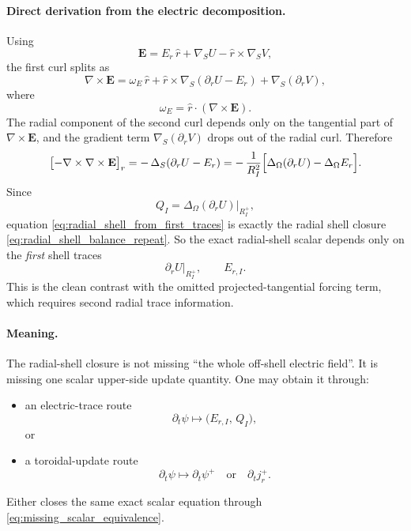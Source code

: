 \documentclass[11pt,a4paper]{article}
\begin{document}
\paragraph{Direct derivation from the electric decomposition.}
Using
\[
\mathbf E
=
E_r\,\hat r + \nabla_S U - \hat r\times \nabla_S V,
\]
the first curl splits as
\[
\nabla\times \mathbf E
=
\omega_E\,\hat r
+
\hat r\times \nabla_S(\partial_r U - E_r)
+
\nabla_S(\partial_r V),
\]
where
\[
\omega_E = \hat r\cdot(\nabla\times \mathbf E).
\]
The radial component of the second curl depends only on the tangential part of
\(\nabla\times \mathbf E\), and the gradient term \(\nabla_S(\partial_r V)\)
drops out of the radial curl. Therefore
\begin{equation}
\bigl[-\nabla\times\nabla\times \mathbf E\bigr]_r
=
-\,\Delta_S(\partial_r U - E_r)
=
-\,\frac{1}{R_I^2}\Bigl[\Delta_\Omega(\partial_r U) - \Delta_\Omega E_r\Bigr].
\label{eq:radial_shell_from_first_traces}
\end{equation}
Since
\[
Q_I = \Delta_\Omega(\partial_r U)\big|_{R_I^+},
\]
equation \eqref{eq:radial_shell_from_first_traces} is exactly the radial shell
closure \eqref{eq:radial_shell_balance_repeat}. So the exact radial-shell
scalar depends only on the \emph{first} shell traces
\[
\partial_r U\big|_{R_I^+},
\qquad
E_{r,I}.
\]
This is the clean contrast with the omitted projected-tangential forcing term,
which requires second radial trace information.

\paragraph{Meaning.}
The radial-shell closure is not missing ``the whole off-shell electric field''.
It is missing one scalar upper-side update quantity. One may obtain it through:
\begin{itemize}
\item an electric-trace route
\[
\partial_t\psi \mapsto \bigl(E_{r,I},\,Q_I\bigr),
\]
or
\item a toroidal-update route
\[
\partial_t\psi \mapsto \partial_t\psi^+
\quad\text{or}\quad
\partial_t j_r^+.
\]
\end{itemize}
Either closes the same exact scalar equation through
\eqref{eq:missing_scalar_equivalence}.
\end{document}
